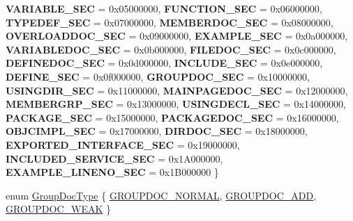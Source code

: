\begin{DoxyCompactItemize}
{\bfseries V\+A\+R\+I\+A\+B\+L\+E\+\_\+\+S\+EC} = 0x05000000, 
{\bfseries F\+U\+N\+C\+T\+I\+O\+N\+\_\+\+S\+EC} = 0x06000000, 
\newline
{\bfseries T\+Y\+P\+E\+D\+E\+F\+\_\+\+S\+EC} = 0x07000000, 
{\bfseries M\+E\+M\+B\+E\+R\+D\+O\+C\+\_\+\+S\+EC} = 0x08000000, 
{\bfseries O\+V\+E\+R\+L\+O\+A\+D\+D\+O\+C\+\_\+\+S\+EC} = 0x09000000, 
{\bfseries E\+X\+A\+M\+P\+L\+E\+\_\+\+S\+EC} = 0x0a000000, 
\newline
{\bfseries V\+A\+R\+I\+A\+B\+L\+E\+D\+O\+C\+\_\+\+S\+EC} = 0x0b000000, 
{\bfseries F\+I\+L\+E\+D\+O\+C\+\_\+\+S\+EC} = 0x0c000000, 
{\bfseries D\+E\+F\+I\+N\+E\+D\+O\+C\+\_\+\+S\+EC} = 0x0d000000, 
{\bfseries I\+N\+C\+L\+U\+D\+E\+\_\+\+S\+EC} = 0x0e000000, 
\newline
{\bfseries D\+E\+F\+I\+N\+E\+\_\+\+S\+EC} = 0x0f000000, 
{\bfseries G\+R\+O\+U\+P\+D\+O\+C\+\_\+\+S\+EC} = 0x10000000, 
{\bfseries U\+S\+I\+N\+G\+D\+I\+R\+\_\+\+S\+EC} = 0x11000000, 
{\bfseries M\+A\+I\+N\+P\+A\+G\+E\+D\+O\+C\+\_\+\+S\+EC} = 0x12000000, 
\newline
{\bfseries M\+E\+M\+B\+E\+R\+G\+R\+P\+\_\+\+S\+EC} = 0x13000000, 
{\bfseries U\+S\+I\+N\+G\+D\+E\+C\+L\+\_\+\+S\+EC} = 0x14000000, 
{\bfseries P\+A\+C\+K\+A\+G\+E\+\_\+\+S\+EC} = 0x15000000, 
{\bfseries P\+A\+C\+K\+A\+G\+E\+D\+O\+C\+\_\+\+S\+EC} = 0x16000000, 
\newline
{\bfseries O\+B\+J\+C\+I\+M\+P\+L\+\_\+\+S\+EC} = 0x17000000, 
{\bfseries D\+I\+R\+D\+O\+C\+\_\+\+S\+EC} = 0x18000000, 
{\bfseries E\+X\+P\+O\+R\+T\+E\+D\+\_\+\+I\+N\+T\+E\+R\+F\+A\+C\+E\+\_\+\+S\+EC} = 0x19000000, 
{\bfseries I\+N\+C\+L\+U\+D\+E\+D\+\_\+\+S\+E\+R\+V\+I\+C\+E\+\_\+\+S\+EC} = 0x1\+A000000, 
\newline
{\bfseries E\+X\+A\+M\+P\+L\+E\+\_\+\+L\+I\+N\+E\+N\+O\+\_\+\+S\+EC} = 0x1\+B000000
 \}
\item 
enum \mbox{\hyperlink{class_entry_a470b655d0d6179559a11a81e6617d509}{Group\+Doc\+Type}} \{ \mbox{\hyperlink{class_entry_a470b655d0d6179559a11a81e6617d509af6812be32a740baaad470ce4aec182be}{G\+R\+O\+U\+P\+D\+O\+C\+\_\+\+N\+O\+R\+M\+AL}}, 
\mbox{\hyperlink{class_entry_a470b655d0d6179559a11a81e6617d509a7637daf4200f6f55374604f2384ac925}{G\+R\+O\+U\+P\+D\+O\+C\+\_\+\+A\+DD}}, 
\mbox{\hyperlink{class_entry_a470b655d0d6179559a11a81e6617d509a4231a193e86f3b43e9b1b6fe12f64ed0}{G\+R\+O\+U\+P\+D\+O\+C\+\_\+\+W\+E\+AK}}
 \}
\end{DoxyCompactItemize}
